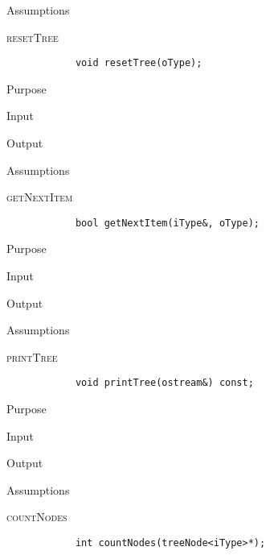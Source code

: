 \documentclass[pdftex, 12pt]{article}
\begin{document}
\begin{description}
\begin{description}
			\item{Assumptions}

		\end{description}
	\item{\textsc{resetTree}}
		\begin{lstlisting}
			void resetTree(oType);
		\end{lstlisting}
		\begin{description}

			\item{Purpose}

			\item{Input}

			\item{Output}

			\item{Assumptions}

		\end{description}
	\item{\textsc{getNextItem}}
		\begin{lstlisting}
			bool getNextItem(iType&, oType);
		\end{lstlisting}
		\begin{description}

			\item{Purpose}

			\item{Input}

			\item{Output}

			\item{Assumptions}

		\end{description}
	\item{\textsc{printTree}}
		\begin{lstlisting}
			void printTree(ostream&) const;
		\end{lstlisting}
		\begin{description}

			\item{Purpose}

			\item{Input}

			\item{Output}

			\item{Assumptions}

		\end{description}
	\item{\textsc{countNodes}}
		\begin{lstlisting}
			int countNodes(treeNode<iType>*);
		\end{lstlisting}
		\begin{description}


\end{description}
\end{description}
\end{document}
